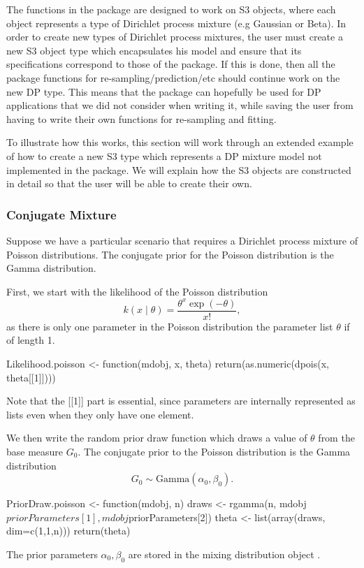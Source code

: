 \documentclass[nojss]{jss}
\begin{document}
The functions in the package are designed to work on S3  objects, where each object represents a type of Dirichlet process mixture (e.g Gaussian or Beta). In order to create new types of Dirichlet process mixtures, the user must create a new S3 object type which encapsulates his model and ensure that its specifications correspond to those of the package. If this is done, then all the package functions for re-sampling/prediction/etc should continue work on the new DP type. This means that the package can hopefully be used for DP applications that we did not consider when writing it, while saving the user from having to write their own functions for re-sampling and fitting.

To illustrate how this works, this section will work through an extended example of how to create a new S3 type which represents a DP mixture model not implemented in the  package. We will explain how the S3 objects are constructed in detail so that the user will be able to create their own.

\subsubsection{Conjugate Mixture}
Suppose we have a particular scenario that requires a Dirichlet process mixture of Poisson distributions. The conjugate prior for the Poisson distribution is the Gamma distribution.

First, we start with the likelihood of the Poisson distribution
\begin{equation*}
k(x \mid \theta) = \frac{\theta ^x \exp(-\theta)}{x!},
\end{equation*}
as there is only one parameter in the Poisson distribution the parameter list $\theta$ if of length 1.
\begin{CodeInput}
Likelihood.poisson <- function(mdobj, x, theta){
  return(as.numeric(dpois(x, theta[[1]])))
}
\end{CodeInput}
Note that the [[1]] part is essential, since parameters are internally represented as lists even when they only have one element.

We then write the random prior draw function which draws a value of $\theta$ from the base measure $G_0$. The conjugate prior to the Poisson distribution is the Gamma distribution
\begin{equation*}
G_0 \sim \text{Gamma} (\alpha _0, \beta _0).
\end{equation*}
\begin{CodeInput}
PriorDraw.poisson <- function(mdobj, n){
  draws <- rgamma(n, mdobj$priorParameters[1], mdobj$priorParameters[2])
  theta <- list(array(draws, dim=c(1,1,n)))
  return(theta)
 }
\end{CodeInput}
The prior parameters $\alpha_0, \beta_0$ are stored in the mixing distribution object .
\end{document}
